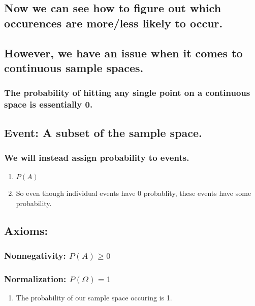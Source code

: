 \documentclass[11pt]{article}
\begin{document}
\subsection{Now we can see how to figure out which occurences are more/less likely to occur.}
\label{sec:org8303eba}
\subsection{However, we have an issue when it comes to continuous sample spaces.}
\label{sec:orgdeeac16}
\subsubsection{The probability of hitting any single point on a continuous space is essentially 0.}
\label{sec:org6639f2e}
\subsection{Event: A subset of the sample space.}
\label{sec:org1866f0a}
\subsubsection{We will instead assign probability to events.}
\label{sec:org6c2db7b}
\begin{enumerate}
\item \(P(A)\)
\label{sec:org9ca6b03}
\item So even though individual events have 0 probablity, these events have some probability.
\label{sec:orgf9183ad}
\end{enumerate}
\subsection{Axioms:}
\label{sec:orge23a5ae}
\subsubsection{Nonnegativity: \(P(A)\ge 0\)}
\label{sec:orgf54790e}
\subsubsection{Normalization: \(P(\Omega)=1\)}
\label{sec:org56c0686}
\begin{enumerate}
\item The probability of our sample space occuring is 1.
\label{sec:orgbf37b43}
\end{enumerate}
\end{document}
